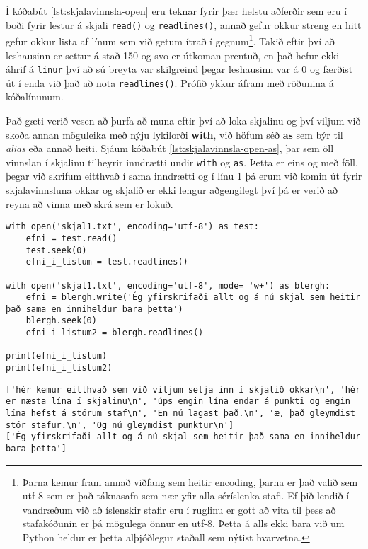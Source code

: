 Í kóðabút \ref{lst:skjalavinnsla-open} eru teknar fyrir þær helstu aðferðir sem eru í boði fyrir lestur á skjali \texttt{read()} og \texttt{readlines()}, annað gefur okkur streng en hitt gefur okkur lista af línum sem við getum ítrað í gegnum\footnote{Þarna kemur fram annað viðfang sem heitir encoding, þarna er það valið sem utf-8 sem er það táknasafn sem nær yfir alla séríslenka stafi. Ef þið lendið í vandræðum við að íslenskir stafir eru í ruglinu er gott að vita til þess að stafakóðunin er þá mögulega önnur en utf-8. Þetta á alls ekki bara við um Python heldur er þetta alþjóðlegur staðall sem nýtist hvarvetna.}.
Takið eftir því að leshausinn er settur á stað 150 og svo er útkoman prentuð, en það hefur ekki áhrif á \texttt{linur} því að sú breyta var skilgreind þegar leshausinn var á 0 og færðist út í enda við það að nota \texttt{readlines()}.
Prófið ykkur áfram með röðunina á kóðalínunum.
 
Það gæti verið vesen að þurfa að muna eftir því að loka skjalinu og því viljum við skoða annan möguleika með nýju lykilorði \textbf{with}, við höfum séð \textbf{as} sem býr til \textit{alias} eða annað heiti.
Sjáum kóðabút \ref{lst:skjalavinnsla-open-as}, þar sem öll vinnslan í skjalinu tilheyrir inndrætti undir \texttt{with} og \texttt{as}.
Þetta er eins og með föll, þegar við skrifum eitthvað í sama inndrætti og í línu 1 þá erum við komin út fyrir skjalavinnsluna okkar og skjalið er ekki lengur aðgengilegt því þá er verið að reyna að vinna með skrá sem er lokuð.
 
\begin{lstlisting}[caption=Hér sjáum við nýja leið til að opna skjal og loka því sjálfkrafa, label=lst:skjalavinnsla-open-as]
with open('skjal1.txt', encoding='utf-8') as test:
	efni = test.read()
	test.seek(0)
	efni_i_listum = test.readlines()

with open('skjal1.txt', encoding='utf-8', mode= 'w+') as blergh:
	efni = blergh.write('Ég yfirskrifaði allt og á nú skjal sem heitir það sama en inniheldur bara þetta')
	blergh.seek(0)
	efni_i_listum2 = blergh.readlines()

print(efni_i_listum)
print(efni_i_listum2)
\end{lstlisting}
\lstset{style=uttak}
\begin{lstlisting}
['hér kemur eitthvað sem við viljum setja inn í skjalið okkar\n', 'hér er næsta lína í skjalinu\n', 'úps engin lína endar á punkti og engin lína hefst á stórum staf\n', 'En nú lagast það.\n', 'æ, það gleymdist stór stafur.\n', 'Og nú gleymdist punktur\n']
['Ég yfirskrifaði allt og á nú skjal sem heitir það sama en inniheldur bara þetta']
\end{lstlisting}
\lstset{style=venjulegt}

